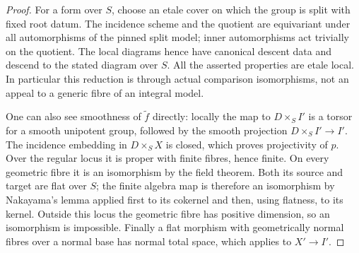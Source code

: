 \begin{proof}
For a form over $S$, choose an etale cover on which the group is
split with fixed root datum.  The incidence scheme and the quotient
are equivariant under all automorphisms of the pinned split model;
inner automorphisms act trivially on the quotient.  The local
diagrams hence have canonical descent data and descend to the stated
diagram over $S$.  All the asserted properties are etale local.
In particular this reduction is through actual comparison
isomorphisms, not an appeal to a generic fibre of an integral model.

One can also see smoothness of $\widetilde f$ directly: locally the
map to $D\times_S I'$ is a torsor for a smooth unipotent group,
followed by the smooth projection $D\times_S I'\to I'$.
The incidence embedding in $D\times_S X$ is closed, which proves
projectivity of $p$.  Over the regular locus it is proper with finite
fibres, hence finite.  On every geometric fibre it is an isomorphism
by the field theorem.  Both its source and target are flat over $S$;
the finite algebra map is therefore an isomorphism by Nakayama's
lemma applied first to its cokernel and then, using flatness, to its
kernel.  Outside this locus the geometric fibre has positive
dimension, so an isomorphism is impossible.  Finally a flat morphism
with geometrically normal fibres over a normal base has normal total
space, which applies to $X'\to I'$.
\end{proof}

